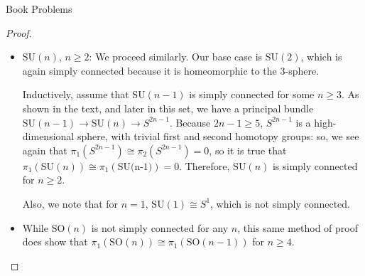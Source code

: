 \documentclass[12pt]{article}
\theoremstyle{definition}
\newenvironment{problem}[2][Problem]{\begin{trivlist}
\item[\hskip \labelsep {\bfseries #1}\hskip \labelsep {\bfseries #2.}]}{\end{trivlist}}
\begin{document}
\begin{section}{Book Problems}
\begin{problem}{3}
\begin{proof}
\begin{itemize}
			    \item $\text{SU}(n)$, $n \geq 2$: We proceed similarly. Our base case is $\text{SU}(2)$, which is again simply connected because it is homeomorphic to the $3$-sphere. 
				    \par Inductively, assume that $\text{SU}(n-1)$ is simply connected for some $n \geq 3$. As shown in the text, and later in this set, we have a principal bundle $\text{SU}(n-1) \to \text{SU}(n) \to S^{2n-1}$. Because $2n - 1 \geq 5$, $S^{2n-1}$ is a high-dimensional sphere, with trivial first and second homotopy groups: so, we see again that $\pi_1(S^{2n-1}) \cong \pi_2(S^{2n-1}) = 0$, so it is true that $\pi_1(\text{SU}(n)) \cong \pi_1(\text{SU(n-1)}) = 0$. Therefore, $\text{SU}(n)$ is simply connected for $n \geq 2$. 
				    \par Also, we note that for $n = 1$, $\text{SU}(1) \cong S^1$, which is not simply connected.
			    \item While $\text{SO}(n)$ is not simply connected for any $n$, this same method of proof does show that $\pi_1(\text{SO}(n)) \cong \pi_1(\text{SO}(n-1))$ for $n \geq 4$.
	    \end{itemize}
    \end{proof}
    \end{problem}
\end{section}
\end{document}
